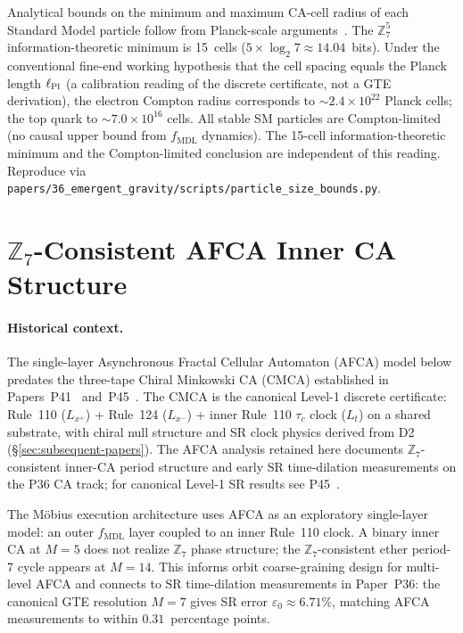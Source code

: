 \documentclass[12pt,letterpaper]{article}
\newcommand{\fmdl}{f_{\mathrm{MDL}}}
\newcommand{\Zseven}{\mathbb{Z}_7}
\begin{document}
Analytical bounds on the minimum and maximum CA-cell radius of each Standard
Model particle follow from Planck-scale arguments~\cite{SpivackCompUniversality}.
The $\Zseven^5$ information-theoretic minimum is 15~cells
($5 \times \log_2 7 \approx 14.04$~bits).
Under the conventional fine-end working hypothesis that the cell spacing
equals the Planck length $\ell_{\rm Pl}$ (a calibration reading of the
discrete certificate, not a GTE derivation),
the electron Compton radius corresponds to $\sim 2.4 \times 10^{22}$ Planck
cells; the top quark to $\sim 7.0 \times 10^{16}$ cells.
All stable SM particles are Compton-limited (no causal upper bound from
$\fmdl$ dynamics).
The 15-cell information-theoretic minimum and the Compton-limited conclusion
are independent of this reading.
Reproduce via \texttt{papers/36\_emergent\_gravity/scripts/particle\_size\_bounds.py}.

\section{\texorpdfstring{$\Zseven$}{Z7}-Consistent AFCA Inner CA Structure}
\label{sec:z7fca}

\paragraph{Historical context.}
The single-layer Asynchronous Fractal Cellular Automaton (AFCA) model below
predates the three-tape Chiral Minkowski CA (CMCA) established in
Papers~P41~\cite{SpivackCMCA} and~P45~\cite{SpivackThreeTapeCMCA}.
The CMCA is the canonical Level-1 discrete certificate: Rule~110 ($L_{x^+}$) +
Rule~124 ($L_{x^-}$) + inner Rule~110 $\tau_c$ clock ($L_t$) on a shared substrate,
with chiral null structure and SR clock physics derived from D2
(\S\ref{sec:subsequent-papers}).
The AFCA analysis retained here documents $\Zseven$-consistent inner-CA period
structure and early SR time-dilation measurements on the P36 CA track; for
canonical Level-1 SR results see P45~\cite{SpivackThreeTapeCMCA}.

The M\"{o}bius execution architecture uses AFCA as an exploratory single-layer model:
an outer $\fmdl$ layer coupled to an inner Rule~110 clock.
A binary inner CA at $M = 5$ does not realize $\Zseven$ phase structure; the
$\Zseven$-consistent ether period-7 cycle appears at $M = 14$.
This informs orbit coarse-graining design for multi-level AFCA and connects to
SR time-dilation measurements in Paper~P36: the canonical GTE resolution $M = 7$
gives SR error $\varepsilon_0 \approx 6.71\%$, matching AFCA measurements to
within $0.31$~percentage points.
\end{document}
